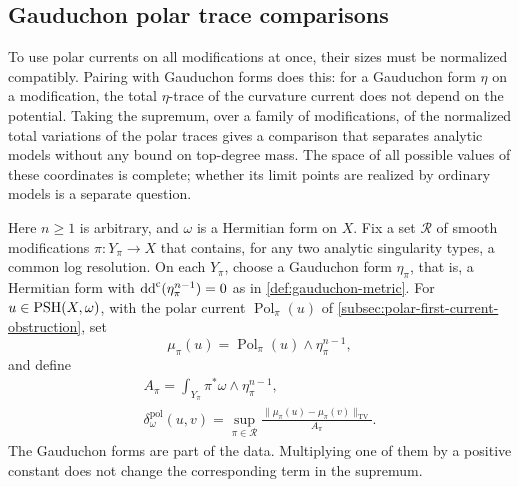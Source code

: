 \subsection{Gauduchon polar trace comparisons}
\label{subsec:gauduchon-polar-comparison}

To use polar currents on all modifications at once, their sizes must be normalized compatibly. Pairing with Gauduchon forms does this: for a Gauduchon form $\eta$ on a modification, the total $\eta$-trace of the curvature current does not depend on the potential. Taking the supremum, over a family of modifications, of the normalized total variations of the polar traces gives a comparison that separates analytic models without any bound on top-degree mass. The space of all possible values of these coordinates is complete; whether its limit points are realized by ordinary models is a separate question.

Here $n\geq1$ is arbitrary, and $\omega$ is a Hermitian form on $X$. Fix a set $\mathscr R$ of smooth modifications $\pi\colon Y_\pi\to X$ that contains, for any two analytic singularity types, a common log resolution. On each $Y_\pi$, choose a Gauduchon form $\eta_\pi$, that is, a Hermitian form with $\mathrm{dd}^{\mathrm{c}}(\eta_\pi^{n-1})=0$ as in \cref{def:gauduchon-metric}. For $u\in\mathrm{PSH}(X,\omega)$, with the polar current $\operatorname{Pol}_\pi(u)$ of \cref{subsec:polar-first-current-obstruction}, set
\[
 \mu_\pi(u)=\operatorname{Pol}_\pi(u)\wedge\eta_\pi^{n-1},
\]
and define
\begin{equation}\label{eq:gauduchon-polar-comparison}
 \begin{gathered}
 A_\pi=\int_{Y_\pi}\pi^*\omega\wedge\eta_\pi^{n-1},\\
 \delta_\omega^{\mathrm{pol}}(u,v)
       =\sup_{\pi\in\mathscr R}
          \frac{\|\mu_\pi(u)-\mu_\pi(v)\|_{\mathrm{TV}}}{A_\pi}.
 \end{gathered}
\end{equation}
The Gauduchon forms are part of the data. Multiplying one of them by a positive constant does not change the corresponding term in the supremum.

